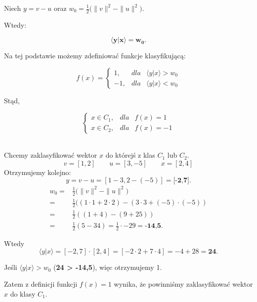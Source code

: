Niech $y = v - u$ oraz $w_{0} = \frac{1}{2} \bigg(\|v\|^{2} - \|u\|^{2}\bigg).$ 

Wtedy:

\begin{equation*}
\bm{\big \langle y|x \big \rangle = w_{0}}.
\end{equation*}

Na tej podstawie możemy zdefiniować funkcje klasyfikującą:

\begin{equation}
f(x) =\left\{\begin{matrix}
1, & dla  & \big \langle y|x \big \rangle > w_{0} \\ 
-1,& dla & \big \langle y|x \big \rangle < w_{0}  
\end{matrix}\right.
\end{equation}

Stąd,

\begin{equation}
\left\{\begin{matrix}
x \in C_{1}, & dla  & f(x) = 1 \\ 
x \in C_{2},& dla & f(x) = -1
\end{matrix}\right.
\end{equation}
\\
\begin{przyklad}
Chcemy zaklasyfikować wektor $x$ do którejś z klas $C_{1}$ lub ${C_{2}}$.
\\

\begin{equation*}
v = [1,2]  \qquad u =[3, -5] \qquad x = [2,4]
\end{equation*}
Otrzymujemy kolejno:
\begin{equation}
    y =  v - u = [1 - 3 , 2 -(-5)] = \textbf{[-2,7]}.
\end{equation}
\begin{align}
       w_{0} = &  \frac{1}{2} \big(\|v\|^{2} - \|u\|^{2}\big)  \\ 
        = &\frac{1}{2}((1 \cdot 1 + 2 \cdot 2) - (3 \cdot 3 + (-5) \cdot (-5))  \\
        = & \frac{1}{2}((1 + 4) - (9 + 25))   \\
       = &\frac{1}{2}(5 - 34) = \frac{1}{2} \cdot -29 = \textbf{-14,5}.
    \end{align}


Wtedy
\begin{equation}
    \big \langle y|x  \big \rangle = [-2,7] \cdot [2,4]
    = [-2 \cdot 2 + 7 \cdot 4] = -4 + 28 = \textbf{24}.
\end{equation}

\begin{center}
Jeśli $ \big \langle y|x \big \rangle > w_{0}$ (\textbf{24 > -14,5}), więc otrzymujemy 1.
\end{center}

Zatem z definicji funkcji $f(x) = 1$ wynika, że powinniśmy zaklasyfikować wektor $x$ do klasy $C_{1}$.
\end{przyklad}